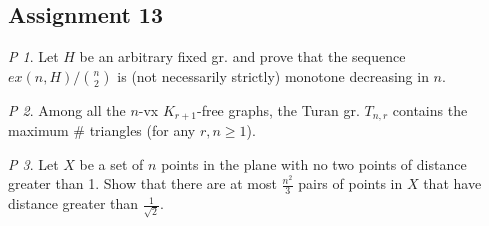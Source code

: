 \documentclass[11pt, fleqn, a4paper, landscape]{article}
\theoremstyle{plain} %
\theoremstyle{remark} %
\newtheorem{problem}{P}
\theoremstyle{definition} %
\begin{document}
\begin{multicols}{5}
\subsection{Assignment 13}

\begin{problem}
Let $H$ be an arbitrary fixed gr. and prove that the sequence $ex(n,H)/\binom{n}{2}$ is (not necessarily strictly) monotone decreasing in $n$.
\end{problem}

\begin{problem}
Among all the $n$-vx $K_{r+1}$-free graphs, the Turan gr. $T_{n,r}$ contains the maximum \# triangles (for any $r, n \ge 1$).
\end{problem}

\begin{problem}
Let $X$ be a set of $n$ points in the plane with no two points of distance greater than 1. Show that there are at most $\frac{n^2}{3}$ pairs of points in $X$ that have distance greater than $\frac{1}{\sqrt{2}}$.
\end{problem}


\end{multicols}
\end{document}
